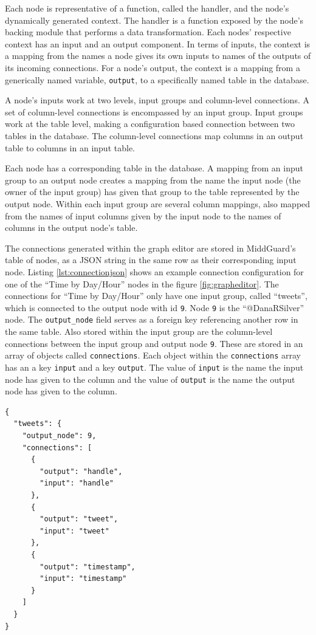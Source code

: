 \documentclass[midd]{thesis}
\begin{document}
Each node is representative of a function, called the handler, and the node's
dynamically generated context. The handler is a function exposed by the node's
backing module that performs a data transformation. Each nodes' respective
context has an input and an output component. In terms of inputs, the context is
a mapping from the names a node gives its own inputs to names of the outputs of
its incoming connections. For a node's output, the context is a mapping from a
generically named variable, \texttt{output}, to a specifically named table in
the database.

A node's inputs work at two levels, input groups and column-level connections. A
set of column-level connections is encompassed by an input group. Input groups
work at the table level, making a configuration based connection between two
tables in the database. The column-level connections map columns in an output
table to columns in an input table.

Each node has a corresponding table in the database. A mapping from an input
group to an output node creates a mapping from the name the input node (the
owner of the input group) has given that group to the table represented by the
output node. Within each input group are several column mappings, also mapped
from the names of input columns given by the input node to the names of columns
in the output node's table.

The connections generated within the graph editor are stored in MiddGuard's
table of nodes, as a JSON string in the same row as their corresponding input
node. Listing \ref{lst:connectionjson} shows an example connection configuration
for one of the ``Time by Day/Hour'' nodes in the figure \ref{fig:grapheditor}.
The connections for ``Time by Day/Hour'' only have one input group, called
``tweets'', which is connected to the output node with id \texttt{9}. Node
\texttt{9} is the ``@DanaRSilver'' node. The \texttt{output\_node} field serves
as a foreign key referencing another row in the same table. Also stored within
the input group are the column-level connections between the input group and
output node \texttt{9}. These are stored in an array of objects called
\texttt{connections}. Each object within the \texttt{connections} array has an a
key \texttt{input} and a key \texttt{output}. The value of \texttt{input} is the
name the input node has given to the column and the value of \texttt{output} is
the name the output node has given to the column.

\begin{lstlisting}[caption={A node's connection configuration. The node has a connection from its input group ``tweets'' to the node with id 9.}, captionpos=b, label={lst:connectionjson}]
{
  "tweets": {
    "output_node": 9,
    "connections": [
      {
        "output": "handle",
        "input": "handle"
      },
      {
        "output": "tweet",
        "input": "tweet"
      },
      {
        "output": "timestamp",
        "input": "timestamp"
      }
    ]
  }
}
\end{lstlisting}
\end{document}
